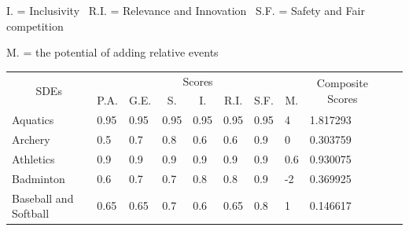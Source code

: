 \documentclass[a4paper]{article}
\begin{document}
I. = Inclusivity \ R.I. = Relevance and Innovation \ S.F. = Safety and Fair competition

M. = the potential of adding relative events
\begin{table}[h]
    \begin{tabular}{|l|lllllll|l|ll}
    \cline{1-9}
    \multicolumn{1}{|c|}{\multirow{2}{*}{SDEs}} & \multicolumn{7}{c|}{Scores}                                                                                                                                                                                 & \multicolumn{1}{c|}{\multirow{2}{*}{Composite Scores}} &  &  \\ \cline{2-8}
    \multicolumn{1}{|c|}{}                      & \multicolumn{1}{c|}{P.A.}     & \multicolumn{1}{c|}{G.E.}     & \multicolumn{1}{c|}{S.}   & \multicolumn{1}{c|}{I.}   & \multicolumn{1}{c|}{R.I.} & \multicolumn{1}{c|}{S.F.}     & \multicolumn{1}{c|}{M.} & \multicolumn{1}{c|}{}                                  &  &  \\ \cline{1-9}
    Aquatics                                    & \multicolumn{1}{l|}{0.95}     & \multicolumn{1}{l|}{0.95}     & \multicolumn{1}{l|}{0.95} & \multicolumn{1}{l|}{0.95} & \multicolumn{1}{l|}{0.95} & \multicolumn{1}{l|}{0.95}     & 4                       & 1.817293                                               &  &  \\ \cline{1-9}
    Archery                                     & \multicolumn{1}{l|}{0.5}      & \multicolumn{1}{l|}{0.7}      & \multicolumn{1}{l|}{0.8}  & \multicolumn{1}{l|}{0.6}  & \multicolumn{1}{l|}{0.6}  & \multicolumn{1}{l|}{0.9}      & 0                       & 0.303759                                               &  &  \\ \cline{1-9}
    Athletics                                   & \multicolumn{1}{l|}{0.9}      & \multicolumn{1}{l|}{0.9}      & \multicolumn{1}{l|}{0.9}  & \multicolumn{1}{l|}{0.9}  & \multicolumn{1}{l|}{0.9}  & \multicolumn{1}{l|}{0.9}      & 0.6                     & 0.930075                                               &  &  \\ \cline{1-9}
    Badminton                                   & \multicolumn{1}{l|}{0.6}      & \multicolumn{1}{l|}{0.7}      & \multicolumn{1}{l|}{0.7}  & \multicolumn{1}{l|}{0.8}  & \multicolumn{1}{l|}{0.8}  & \multicolumn{1}{l|}{0.9}      & -2                      & 0.369925                                               &  &  \\ \cline{1-9}
    Baseball and Softball                       & \multicolumn{1}{l|}{0.65}     & \multicolumn{1}{l|}{0.65}     & \multicolumn{1}{l|}{0.7}  & \multicolumn{1}{l|}{0.6}  & \multicolumn{1}{l|}{0.65} & \multicolumn{1}{l|}{0.8}      & 1                       & 0.146617                                               &  &  \\ \cline{1-9}

\end{tabular}
\end{table}
\end{document}
